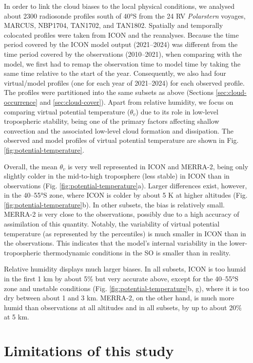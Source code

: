 \documentclass[12pt,a4paper]{article}
\begin{document}
In order to link the cloud biases to the local physical conditions, we analysed about 2300 radiosonde profiles south of 40°S from the 24 RV
\emph{Polarstern} voyages, MARCUS, NBP1704, TAN1702, and TAN1802. Spatially and
temporally colocated profiles were taken from ICON and the reanalyses.
Because the time period covered by the ICON model output (2021--2024) was
different from the time period covered by the observations (2010--2021), when
comparing with the model, we first had to remap the observation time to model
time by taking the same time relative to the start of the year. Consequently,
we also had four virtual/model profiles (one for each year of 2021--2024) for
each observed profile.
The profiles were partitioned into the same subsets as
above (Sections \ref{sec:cloud-occurrence} and \ref{sec:cloud-cover}).  Apart
from relative humidity, we focus on comparing virtual potential temperature
($\theta_v$) due to its role in low-level tropospheric stability, being one of
the primary factors affecting shallow convection and the associated low-level
cloud formation and dissipation. The observed and model profiles of virtual
potential temperature are shown in Fig. \ref{fig:potential-temperature}.

Overall, the mean $\theta_v$ is very well represented in ICON and
MERRA-2, being only slightly colder in the mid-to-high troposphere (less
stable) in ICON than in observations (Fig. \ref{fig:potential-temperature}a).
Larger differences exist, however, in the 40--55°S zone, where ICON is colder by about 5 K at higher altitudes (Fig.
\ref{fig:potential-temperature}b). In other subsets, the bias is relatively
small. MERRA-2 is very close to the observations, possibly due to a high
accuracy of assimilation of this quantity. Notably, the variability of virtual
potential temperature (as represented by the percentiles) is much smaller in
ICON than in the observations. This indicates that the model's internal
variability in the lower-tropospheric thermodynamic conditions in the SO is
smaller than in reality.

Relative humidity displays much larger biases. In all subsets, ICON is too
humid in the first 1 km by about 5\% but very accurate above, except for the 40--55°S zone
and unstable conditions (Fig. \ref{fig:potential-temperature}b, g),  where it
is too dry between about 1 and 3 km. MERRA-2, on the other hand, is much more
humid than observations at all altitudes and in all subsets, by up to about
20\% at 5 km.

\section{Limitations of this study}
\end{document}
